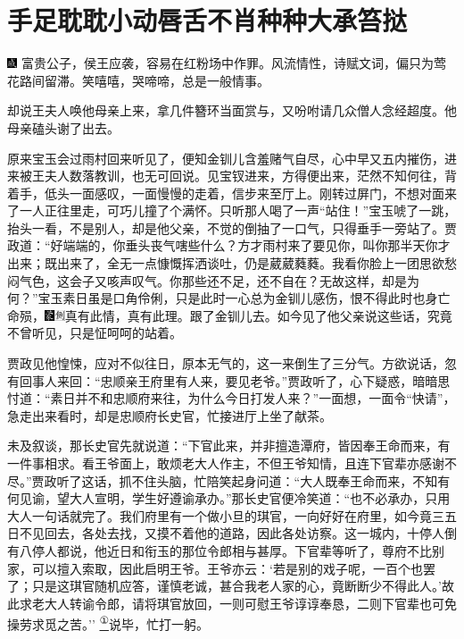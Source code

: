 

\chapter{手足耽耽小动唇舌\hspace{.5em}不肖种种大承笞挞}

{\includegraphics[width=3mm]{../Images/00005}  \kaishu 富贵公子，侯王应袭，容易在红粉场中作罪。风流情性，诗赋文词，偏只为莺花路间留滞。笑嘻嘻，哭啼啼，总是一般情事。}

却说王夫人唤他母亲上来，拿几件簪环当面赏与，又吩咐请几众僧人念经超度。他母亲磕头谢了出去。

原来宝玉会过雨村回来听见了，便知金钏儿含羞赌气自尽，心中早又五内摧伤，进来被王夫人数落教训，也无可回说。见宝钗进来，方得便出来，茫然不知何往，背着手，低头一面感叹，一面慢慢的走着，信步来至厅上。刚转过屏门，不想对面来了一人正往里走，可巧儿撞了个满怀。只听那人喝了一声``站住！''宝玉唬了一跳，抬头一看，不是别人，却是他父亲，不觉的倒抽了一口气，只得垂手一旁站了。贾政道：``好端端的，你垂头丧气嗐些什么？方才雨村来了要见你，叫你那半天你才出来；既出来了，全无一点慷慨挥洒谈吐，仍是葳葳蕤蕤。我看你脸上一团思欲愁闷气色，这会子又咳声叹气。你那些还不足，还不自在？无故这样，却是为何？''宝玉素日虽是口角伶俐，只是此时一心总为金钏儿感伤，恨不得此时也身亡命殒，{\includegraphics[width=3mm]{../Images/00006}\includegraphics[width=3mm]{../Images/00011}\footnotesize \kaishu 真有此情，真有此理。}跟了金钏儿去。如今见了他父亲说这些话，究竟不曾听见，只是怔呵呵的站着。

贾政见他惶悚，应对不似往日，原本无气的，这一来倒生了三分气。方欲说话，忽有回事人来回：``忠顺亲王府里有人来，要见老爷。''贾政听了，心下疑惑，暗暗思忖道：``素日并不和忠顺府来往，为什么今日打发人来？''一面想，一面令``快请''，急走出来看时，却是忠顺府长史官，忙接进厅上坐了献茶。

未及叙谈，那长史官先就说道：``下官此来，并非擅造潭府，皆因奉王命而来，有一件事相求。看王爷面上，敢烦老大人作主，不但王爷知情，且连下官辈亦感谢不尽。''贾政听了这话，抓不住头脑，忙陪笑起身问道：``大人既奉王命而来，不知有何见谕，望大人宣明，学生好遵谕承办。''那长史官便冷笑道：``也不必承办，只用大人一句话就完了。我们府里有一个做小旦的琪官，一向好好在府里，如今竟三五日不见回去，各处去找，又摸不着他的道路，因此各处访察。这一城内，十停人倒有八停人都说，他近日和衔玉的那位令郎相与甚厚。下官辈等听了，尊府不比别家，可以擅入索取，因此启明王爷。王爷亦云：`若是别的戏子呢，一百个也罢了；只是这琪官随机应答，谨慎老诚，甚合我老人家的心，竟断断少不得此人。'故此求老大人转谕令郎，请将琪官放回，一则可慰王爷谆谆奉恳，二则下官辈也可免操劳求觅之苦。''{
}\href{../Text/part0037_split_000.html\#lnkback_1_a}{\textsuperscript{①}}说毕，忙打一躬。

